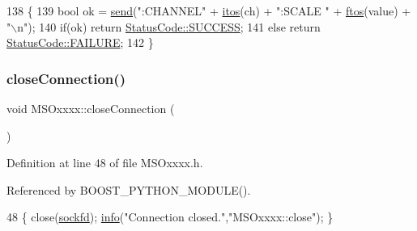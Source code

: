 \begin{DoxyCode}
138 \{
139     \textcolor{keywordtype}{bool} ok = \hyperlink{classMSOxxxx_ae77668a1ae4ccb74e0ed5f2485dfdebf}{send}(\textcolor{stringliteral}{":CHANNEL"} + \hyperlink{Tools_8h_af330027dbdafb9a30768b3613c553e60}{itos}(ch) + \textcolor{stringliteral}{":SCALE "} + \hyperlink{classMSOxxxx_ab9c897c3dc0a52cbe5a5da67fc520ed7}{ftos}(value) + \textcolor{stringliteral}{"\(\backslash\)n"});
140     \textcolor{keywordflow}{if}(ok)  \textcolor{keywordflow}{return} \hyperlink{classStatusCode_a6f565cbeadc76d14c72f047e5e85eb4badd0da38d3ba0d922efd1f4619bc37ad8}{StatusCode::SUCCESS};
141     \textcolor{keywordflow}{else}        \textcolor{keywordflow}{return} \hyperlink{classStatusCode_a6f565cbeadc76d14c72f047e5e85eb4ba3da73d4c469762eb9d3c960368252b26}{StatusCode::FAILURE};
142 \}
\end{DoxyCode}
\mbox{\label{classMSOxxxx_a65fd9540df836c24a044807f12071c92}} 
\subsubsection{\texorpdfstring{close\+Connection()}{closeConnection()}}
{\footnotesize\ttfamily void M\+S\+Oxxxx\+::close\+Connection (\begin{DoxyParamCaption}{ }\end{DoxyParamCaption})\hspace{0.3cm}{\ttfamily [inline]}}



Definition at line 48 of file M\+S\+Oxxxx.\+h.



Referenced by B\+O\+O\+S\+T\+\_\+\+P\+Y\+T\+H\+O\+N\+\_\+\+M\+O\+D\+U\+L\+E().


\begin{DoxyCode}
48 \{   close(\hyperlink{classMSOxxxx_acf030a8f1ddd78d632816c856f50455c}{sockfd});    \hyperlink{classObject_a644fd329ea4cb85f54fa6846484b84a8}{info}(\textcolor{stringliteral}{"Connection closed."},\textcolor{stringliteral}{"MSOxxxx::close"});    \}
\end{DoxyCode}
\mbox{\label{classMSOxxxx_a3fc4e785c764c2abb0c0c2da4d71108a}} 
